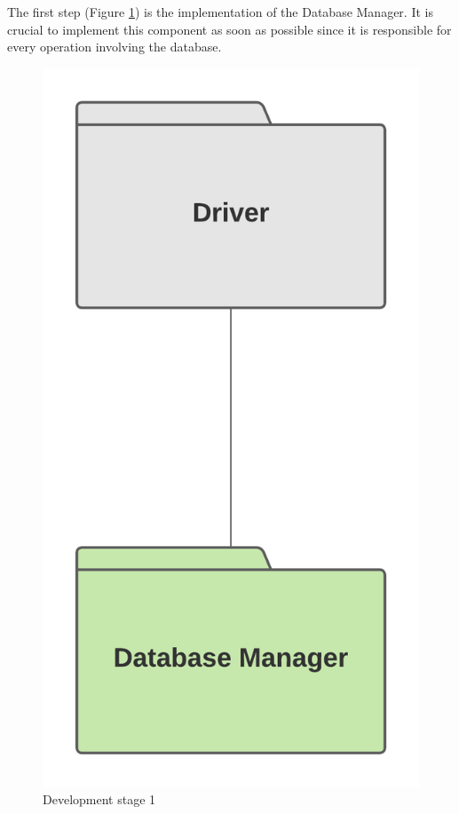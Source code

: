 \documentclass[10pt]{article} %
\begin{document}
The first step (Figure \ref{fig:impl1}) is the implementation of the Database Manager. It is crucial to implement this component as soon as possible
since it is responsible for every operation involving the database.
\begin{figure}[h!]
    \centering
    \includegraphics[scale=0.4]{images/impl/step1.png}
    \caption{Development stage 1}
    \label{fig:impl1}
\end{figure}
\end{document}
